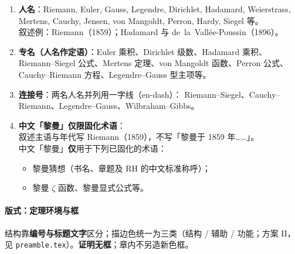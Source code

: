 \begin{enumerate}[leftmargin=2em,itemsep=0.35em]
  \item \textbf{人名}：Riemann, Euler, Gauss, Legendre, Dirichlet, Hadamard,
        Weierstrass, Mertens, Cauchy, Jensen, von Mangoldt, Perron, Hardy, Siegel 等。\\
        叙述例：Riemann（1859）；Hadamard 与 de~la~Vallée-Poussin（1896）。
  \item \textbf{专名（人名作定语）}：Euler 乘积、Dirichlet 级数、Hadamard 乘积、
        Riemann--Siegel 公式、Mertens 定理、von Mangoldt 函数、Perron 公式、
        Cauchy--Riemann 方程、Legendre--Gauss 型主项等。
  \item \textbf{连接号}：两名人名并列用一字线（en-dash）：
        Riemann--Siegel、Cauchy--Riemann、Legendre--Gauss、Wilbraham--Gibbs。
  \item \textbf{中文「黎曼」仅限固化术语}：\\
        叙述主语与年代写 Riemann（1859），不写「黎曼于 1859 年……」。\\
        中文「黎曼」\textbf{仅}用于下列已固化的术语：
        \begin{itemize}
          \item 黎曼猜想（书名、章题及 RH 的中文标准称呼）；
          \item 黎曼 $\zeta$ 函数、黎曼显式公式等。
        \end{itemize}
\end{enumerate}

\paragraph{版式：定理环境与框}
结构靠\textbf{编号与标题文字}区分；描边色统一为三类（结构 / 辅助 / 功能；方案 II，
见 \texttt{preamble.tex}）。\textbf{证明无框}；章内不另造新色框。

